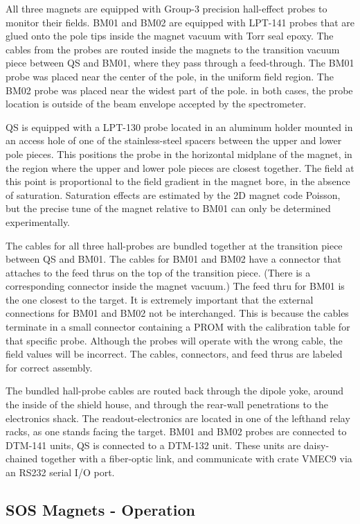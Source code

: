 All three magnets are equipped with Group-3 precision hall-effect probes to
monitor their fields. BM01 and BM02 are equipped with LPT-141 probes that are
glued onto the pole tips inside the magnet vacuum with Torr seal epoxy. The cables
from the probes are routed inside the magnets to the transition vacuum piece
between QS and BM01, where they pass through a feed-through. The BM01 probe was
placed near the center of the pole, in the uniform field region. The BM02 probe
was placed near the widest part of the pole. in both cases, the probe location
is outside of the beam envelope accepted by the spectrometer.

QS is equipped with a LPT-130 probe located in an aluminum holder mounted in an
access hole of one of the stainless-steel spacers between the upper and lower
pole pieces. This positions the probe in the horizontal midplane of the magnet,
in the region where the upper and lower pole pieces are closest together. The
field at this point is proportional to the field gradient in the magnet bore, in
the absence of saturation. Saturation effects are estimated by the 2D magnet
code Poisson, but the precise tune of the magnet relative to BM01 can only be
determined experimentally.

The cables for all three hall-probes are bundled together at the transition
piece between QS and BM01. The cables for BM01 and BM02 have a connector that
attaches to the feed thrus on the top of the transition piece. (There is a
corresponding connector inside the magnet vacuum.) The feed thru for BM01 is
the one closest to the target. It is extremely important that the external
connections for BM01 and BM02 not be interchanged. This is because the cables
terminate in a small connector containing a PROM with the calibration table for
that specific probe. Although the probes will operate with the wrong cable, the
field values will be incorrect. The cables, connectors, and feed thrus are
labeled for correct assembly.

The bundled hall-probe cables are routed back through the dipole yoke, around
the inside of the shield house, and through the rear-wall penetrations to the
electronics shack. The readout-electronics are located in one of the lefthand
relay racks, as one stands facing the target. BM01 and BM02 probes are connected
to DTM-141 units, QS is connected to a DTM-132 unit. These units are
daisy-chained together with a fiber-optic link, and communicate with crate
VMEC9 via an RS232 serial I/O port.

\subsection {SOS Magnets - Operation}

